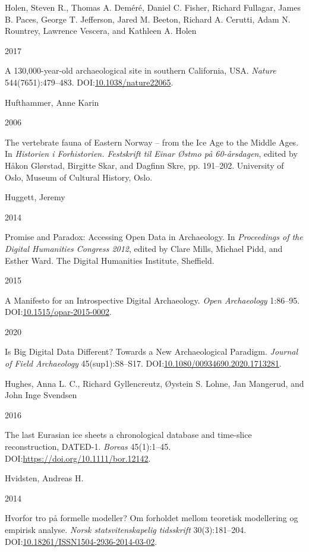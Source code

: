 \documentclass[
  12pt,
  a4paper,
  oneside]{book}
\newlength{\cslhangindent}
\newlength{\csllabelwidth}
\newlength{\cslentryspacingunit} %
\newenvironment{CSLReferences}[2] %
 {%
  \setlength{\parindent}{0pt}
  \ifodd #1
  \let\oldpar\par
  \def\par{\hangindent=\cslhangindent\oldpar}
  \fi
  \setlength{\parskip}{#2\cslentryspacingunit}
 }%
 {}
\newcommand{\CSLBlock}[1]{#1\hfill\break}
\newcommand{\CSLLeftMargin}[1]{\parbox[t]{\csllabelwidth}{#1}}
\newcommand{\CSLRightInline}[1]{\parbox[t]{\linewidth - \csllabelwidth}{#1}\break}
\begin{document}
\begin{CSLReferences}{0}{0}
\leavevmode{}%
\CSLBlock{Holen, Steven R., Thomas A. Deméré, Daniel C. Fisher, Richard Fullagar, James B. Paces, George T. Jefferson, Jared M. Beeton, Richard A. Cerutti, Adam N. Rountrey, Lawrence Vescera, and Kathleen A. Holen}
\CSLLeftMargin{ 2017}
\CSLRightInline{A 130,000-year-old archaeological site in southern California, USA. \emph{Nature} 544(7651):479--483. DOI:\href{https://doi.org/10.1038/nature22065}{10.1038/nature22065}.}

\leavevmode{}%
\CSLBlock{Hufthammer, Anne Karin}
\CSLLeftMargin{ 2006}
\CSLRightInline{{The vertebrate fauna of Eastern Norway -- from the Ice Age to the Middle Ages}. In \emph{{Historien i Forhistorien. Festskrift til Einar Østmo på 60-årsdagen}}, edited by Håkon Glørstad, Birgitte Skar, and Dagfinn Skre, pp. 191--202. University of Oslo, Museum of Cultural History, Oslo.}

\leavevmode{}%
\CSLBlock{Huggett, Jeremy}
\CSLLeftMargin{ 2014}
\CSLRightInline{{Promise and Paradox: Accessing Open Data in Archaeology}. In \emph{{Proceedings of the Digital Humanities Congress 2012}}, edited by Clare Mills, Michael Pidd, and Esther Ward. The Digital Humanities Institute, Sheffield.}

\leavevmode{}%
\CSLLeftMargin{ 2015 }
\CSLRightInline{{A Manifesto for an Introspective Digital Archaeology}. \emph{Open Archaeology} 1:86--95. DOI:\href{https://doi.org/10.1515/opar-2015-0002}{10.1515/opar-2015-0002}.}

\leavevmode{}%
\CSLLeftMargin{ 2020 }
\CSLRightInline{{Is Big Digital Data Different? Towards a New Archaeological Paradigm}. \emph{Journal of Field Archaeology} 45(sup1):S8--S17. DOI:\href{https://doi.org/10.1080/00934690.2020.1713281}{10.1080/00934690.2020.1713281}.}

\leavevmode{}%
\CSLBlock{Hughes, Anna L. C., Richard Gyllencreutz, Øystein S. Lohne, Jan Mangerud, and John Inge Svendsen}
\CSLLeftMargin{ 2016}
\CSLRightInline{The last Eurasian ice sheets {\textendash} a chronological database and time-slice reconstruction, DATED-1. \emph{Boreas} 45(1):1--45. DOI:\url{https://doi.org/10.1111/bor.12142}.}

\leavevmode{}%
\CSLBlock{Hvidsten, Andreas H.}
\CSLLeftMargin{ 2014}
\CSLRightInline{{Hvorfor tro på formelle modeller? Om forholdet mellom teoretisk modellering og empirisk analyse}. \emph{Norsk statsvitenskapelig tidsskrift} 30(3):181--204. DOI:\href{https://doi.org/10.18261/ISSN1504-2936-2014-03-02}{10.18261/ISSN1504-2936-2014-03-02}.}


\end{CSLReferences}
\end{document}
